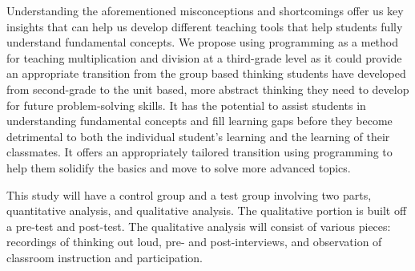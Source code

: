 Understanding the aforementioned misconceptions and shortcomings offer us key insights that can help us develop different teaching tools that help students fully understand fundamental concepts.
We propose using programming as a method for teaching multiplication and division at a third-grade level as it could provide an appropriate transition from the group based thinking students have developed from second-grade to the unit based, more abstract thinking they need to develop for future problem-solving skills.
It has the potential to assist students in understanding fundamental concepts and fill learning gaps before they become detrimental to both the individual student’s learning and the learning of their classmates.
It offers an appropriately tailored transition using programming to help them solidify the basics and move to solve more advanced topics.

This study will have a control group and a test group involving two parts, quantitative analysis, and qualitative analysis.
The qualitative portion is built off a pre-test and post-test.
The qualitative analysis will consist of various pieces: recordings of thinking out loud, pre- and post-interviews, and observation of classroom instruction and participation.
